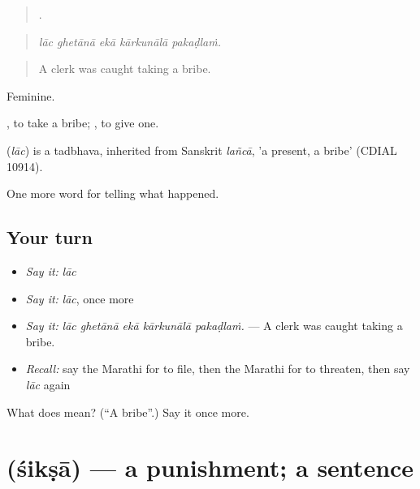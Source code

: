 \begin{quote}
    .
\end{quote}

\begin{quote}
\emph{lāc ghetānā ekā kārkunālā pakaḍlaṁ.}
\end{quote}

\begin{quote}
A clerk was caught taking a bribe.
\end{quote}

Feminine.

 , to take a bribe;  , to give one.

\begin{cousinweb}
\textbf{} (\emph{lāc}) is a tadbhava, inherited from Sanskrit \emph{lañcā}, 'a present, a bribe' (CDIAL 10914).
\end{cousinweb}

\begin{grammarlens}[title={What you've built}]
One more word for telling what happened.
\end{grammarlens}

\subsection*{Your turn}
\begin{itemize}
\raggedright
  \item \emph{Say it:} \emph{lāc}
  \item \emph{Say it:} \emph{lāc}, once more
  \item \emph{Say it:} \emph{lāc ghetānā ekā kārkunālā pakaḍlaṁ.} — A clerk was caught taking a bribe.
  \item \emph{Recall:} say the Marathi for to file, then the Marathi for to threaten, then say \emph{lāc} again
\end{itemize}

\begin{tcolorbox}[breakable,colback=teal!4,colframe=teal!35!black,title={Before you move on}]
What does  mean? (\textquotedblleft{}A bribe\textquotedblright{}.) Say it once more.
\end{tcolorbox}
\section[\texorpdfstring{\mr{शिक्षा} (śikṣā)}{शिक्षा (śikṣā)}]{ (śikṣā) — a punishment; a sentence}

